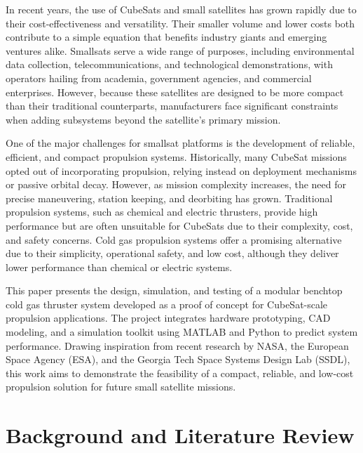 \documentclass{new-aiaa}
\begin{document}
In recent years, the use of CubeSats and small satellites has grown rapidly due to their cost-effectiveness and versatility. Their smaller volume and lower costs both contribute to a simple equation that benefits industry giants and emerging ventures alike. Smallsats serve a wide range of purposes, including environmental data collection, telecommunications, and technological demonstrations, with operators hailing from academia, government agencies, and commercial enterprises. However, because these satellites are designed to be more compact than their traditional counterparts, manufacturers face significant constraints when adding subsystems beyond the satellite’s primary mission.

One of the major challenges for smallsat platforms is the development of reliable, efficient, and compact propulsion systems. Historically, many CubeSat missions opted out of incorporating propulsion, relying instead on deployment mechanisms or passive orbital decay. However, as mission complexity increases, the need for precise maneuvering, station keeping, and deorbiting has grown. Traditional propulsion systems, such as chemical and electric thrusters, provide high performance but are often unsuitable for CubeSats due to their complexity, cost, and safety concerns. Cold gas propulsion systems offer a promising alternative due to their simplicity, operational safety, and low cost, although they deliver lower performance than chemical or electric systems.

This paper presents the design, simulation, and testing of a modular benchtop cold gas thruster system developed as a proof of concept for CubeSat-scale propulsion applications. The project integrates hardware prototyping, CAD modeling, and a simulation toolkit using MATLAB and Python to predict system performance. Drawing inspiration from recent research by NASA, the European Space Agency (ESA), and the Georgia Tech Space Systems Design Lab (SSDL), this work aims to demonstrate the feasibility of a compact, reliable, and low-cost propulsion solution for future small satellite missions.


\section{Background and Literature Review}
\end{document}
